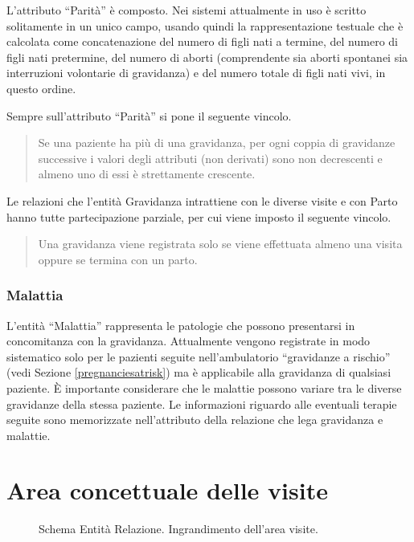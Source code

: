 L'attributo \enquote{Parità} è composto.
Nei sistemi attualmente in uso è scritto solitamente in un unico campo, usando quindi la rappresentazione testuale che è calcolata come concatenazione del numero di figli nati a termine, del numero di figli nati pretermine, del numero di aborti (comprendente sia aborti spontanei sia interruzioni volontarie di gravidanza) e del numero totale di figli nati vivi, in questo ordine.

Sempre sull'attributo \enquote{Parità} si pone il seguente vincolo.
\begin{quote}
Se una paziente ha più di una gravidanza, per ogni coppia di gravidanze successive i valori degli attributi (non derivati) sono non decrescenti e almeno uno di essi è strettamente crescente.
\end{quote}

Le relazioni che l'entità Gravidanza intrattiene con le diverse visite e con Parto hanno tutte partecipazione parziale, per cui viene imposto il seguente vincolo.
\begin{quote}
Una gravidanza viene registrata solo se viene effettuata almeno una visita oppure se termina con un parto.
\end{quote}

\subsubsection{Malattia}

L'entità \enquote{Malattia} rappresenta le patologie che possono presentarsi in concomitanza con la gravidanza.
Attualmente vengono registrate in modo sistematico solo per le pazienti seguite nell'ambulatorio \enquote{gravidanze a rischio} (vedi Sezione \ref{pregnanciesatrisk}) ma è applicabile alla gravidanza di qualsiasi paziente.
È importante considerare che le malattie possono variare tra le diverse gravidanze della stessa paziente.
Le informazioni riguardo alle eventuali terapie seguite sono memorizzate nell'attributo della relazione che lega gravidanza e malattie.

\section{Area concettuale delle visite}

\begin{figure}
    \centering
    
    \caption{Schema Entità Relazione. Ingrandimento dell'area visite.}
    \label{visitserdiagram}
\end{figure}

